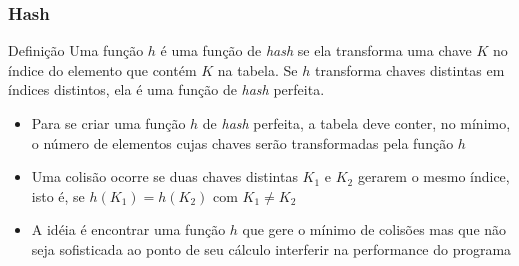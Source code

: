 \begin{frame}

	\frametitle{{Hash}}

	\begin{block}{Definição}
		Uma função $h$ é uma função de \textit{hash} se ela transforma uma chave $K$ no índice do 
        elemento que contém $K$ na tabela. Se $h$ transforma chaves distintas em índices distintos, 
        ela é uma função de \textit{hash} perfeita. 
	\end{block}

	\begin{itemize}
		\item Para se criar uma função $h$ de \textit{hash} perfeita, a tabela deve conter, 
            no mínimo, o número de elementos cujas chaves serão transformadas pela função $h$

		\item Uma colisão ocorre se duas chaves distintas $K_1$ e $K_2$ gerarem o mesmo índice, 
            isto é, se $h(K_1) = h(K_2)$ com $K_1\neq K_2$

		\item A idéia é encontrar uma função $h$ que gere o mínimo de colisões mas que não seja 
            sofisticada ao ponto de seu cálculo interferir na performance do programa
	\end{itemize}

\end{frame}
